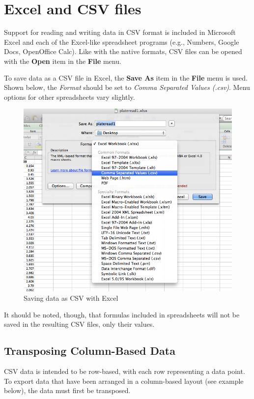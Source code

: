 \section{Excel and CSV files}

Support for reading and writing data in CSV format is included in
Microsoft Excel and each of the Excel-like spreadsheet programs (e.g.,
Numbers, Google Docs, OpenOffice Calc). Like with the native formats,
CSV files can be opened with the \textbf{Open} item in the \textbf{File}
menu.

To save data as a CSV file in Excel, the \textbf{Save As} item in the
\textbf{File} menu is used. Shown below, the \emph{Format} should be set
to \emph{Comma Separated Values (.csv)}. Menu options for other
spreadsheets vary slightly.

\begin{figure}[htbp]
\centering
\includegraphics[width=0.80\columnwidth]{../csv/doc/figures/excel-saveas.png}
\caption{Saving data as CSV with Excel}
\end{figure}

It should be noted, though, that formulas included in spreadsheets will
not be saved in the resulting CSV files, only their values.

\subsection{Transposing Column-Based Data}

CSV data is intended to be row-based, with each row representing a data
point. To export data that have been arranged in a column-based layout
(see example below), the data must first be transposed.

